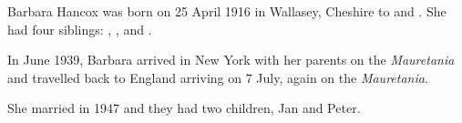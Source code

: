 
Barbara Hancox was born on 25 April 1916 in Wallasey, Cheshire to  and \cite{BarbaraHancoxBirth}. She had four siblings: , ,  and .

In June 1939, Barbara arrived in New York with her parents on the \emph{Mauretania}
and travelled back to England arriving on 7 July, again on the \emph{Mauretania}.\cite{BarbaraHancoxTravel}

She married  in 1947 and they had two children, Jan and Peter.
